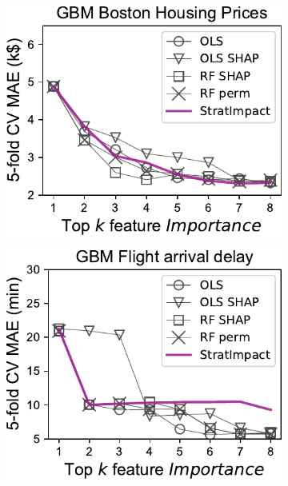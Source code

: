 \documentclass[11pt]{article}
\begin{document}
\begin{figure}
\centering
\begin{subfigure}{.245\textwidth}
    \centering
\includegraphics[scale=0.45]{images/boston-topk-GBM-Importance.pdf}
\end{subfigure}%
\hfill
\begin{subfigure}{.245\textwidth}
    \centering
\includegraphics[scale=0.45]{images/flights-topk-GBM-Importance.pdf}
\end{subfigure}
\hfill
\begin{subfigure}{.245\textwidth}

\end{subfigure}
\end{figure}
\end{document}
